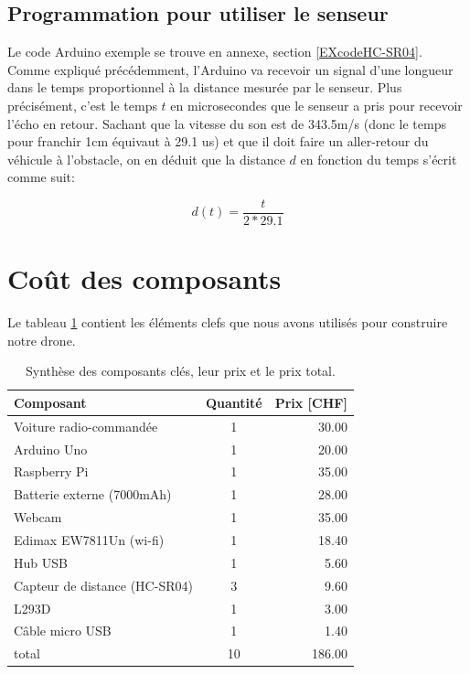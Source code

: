\documentclass[a4paper,11pt]{report}
\begin{document}
{\subsection{Programmation pour utiliser le senseur}

Le code Arduino exemple se trouve en annexe, section \ref{EXcodeHC-SR04}. Comme expliqué précédemment, l'Arduino va recevoir un signal d'une longueur dans le temps proportionnel à la distance mesurée par le senseur. Plus pré\-ci\-sé\-ment, c'est le temps $t$ en microsecondes que le senseur a pris pour recevoir l'écho en retour. Sachant que la vitesse du son est de 343.5m/s (donc le temps pour franchir 1cm équivaut à 29.1 us)  et que il doit faire un aller-retour du véhicule à l'obstacle, on en déduit que la distance $d$ en fonction du temps s'écrit comme suit:

\begin{equation}
d(t)=\frac{t}{2*29.1}
\end{equation}


\section{Coût des composants}
Le tableau \ref{TableCout} contient les éléments clefs que nous avons utilisés pour construire notre drone.

\begin{center}
\begin{table}[h]
\begin{tabular}{| l | c | r |}
\hline
Composant & Quantité & Prix [CHF] \\
\hline
Voiture radio-commandée & 1 & 30.00\\
\hline
Arduino Uno & 1 & 20.00 \\
\hline
Raspberry Pi& 1 & 35.00 \\
\hline
Batterie externe (7000mAh) &1 & 28.00 \\
\hline
Webcam & 1 & 35.00\\
\hline
Edimax EW7811Un (wi-fi) & 1 & 18.40\\
\hline
Hub USB & 1 & 5.60\\
\hline
Capteur de distance (HC-SR04) & 3 & 9.60\\
\hline
L293D & 1 & 3.00\\
\hline
Câble micro USB & 1 & 1.40\\
\hline


\hline
\hline
total & 10 & 186.00\\
\hline

\end{tabular}
\caption{\label{TableCout}Synthèse des composants clés, leur prix et le prix total.}
\end{table}
\end{center}





}
\end{document}
